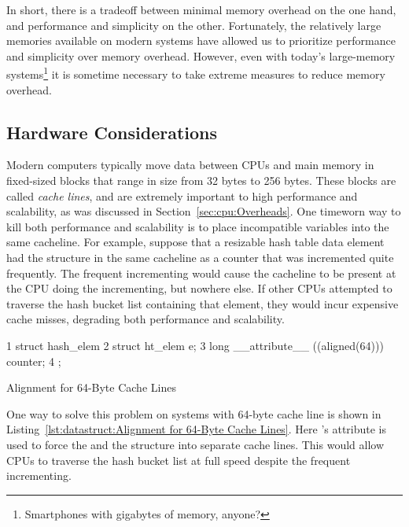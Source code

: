 In short, there is a tradeoff between minimal memory overhead on
the one hand, and performance and simplicity on the other.
Fortunately, the relatively large memories available on modern
systems have allowed us to prioritize performance and simplicity
over memory overhead.
However, even with today's large-memory systems\footnote{
	Smartphones with gigabytes of memory, anyone?}
it is sometime necessary to take extreme measures to reduce
memory overhead.

\subsection{Hardware Considerations}
\label{sec:datastruct:Hardware Considerations}

Modern computers typically move data between CPUs and main memory in
fixed-sized blocks that range in size from 32 bytes to 256 bytes.
These blocks are called \emph{cache lines}, and are extremely important
to high performance and scalability, as was discussed in
Section~\ref{sec:cpu:Overheads}.
One timeworn way to kill both performance and scalability is to
place incompatible variables into the same cacheline.
For example, suppose that a resizable hash table data element had
the  structure in the same cacheline as a counter that
was incremented quite frequently.
The frequent incrementing would cause the cacheline to be present at
the CPU doing the incrementing, but nowhere else.
If other CPUs attempted to traverse the hash bucket list containing
that element, they would incur expensive cache misses, degrading both
performance and scalability.

\begin{listing}[tb]
{ \scriptsize
\begin{verbbox}
1 struct hash_elem {
2   struct ht_elem e;
3   long __attribute__ ((aligned(64))) counter;
4 };
\end{verbbox}
}
\centering
\theverbbox
\caption{Alignment for 64-Byte Cache Lines}
\label{lst:datastruct:Alignment for 64-Byte Cache Lines}
\end{listing}

One way to solve this problem on systems with 64-byte cache line is shown in
Listing~\ref{lst:datastruct:Alignment for 64-Byte Cache Lines}.
Here \GCC's  attribute is used to force the 
and the  structure into separate cache lines.
This would allow CPUs to traverse the hash bucket list at full speed
despite the frequent incrementing.

